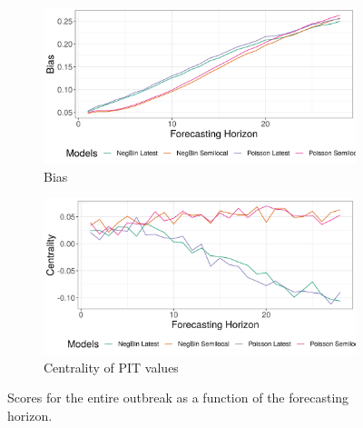 \begin{figure}[H]
\begin{subfigure}{0.5\textwidth}
  \centering
  \includegraphics[width=\linewidth]{../output/Biena_bias.png}  
  \caption{Bias}
  \label{fig:sub-third}
\end{subfigure}
\begin{subfigure}{0.5\textwidth}
  \centering
  \includegraphics[width=\linewidth]{../output/Biena_centrality.png}  
  \caption{Centrality of PIT values}
  \label{fig:nat_scores_4}
\end{subfigure}
  \caption{Scores for the entire outbreak as a function of the forecasting horizon.}

  \label{fig:nat_scores}
\end{figure}
